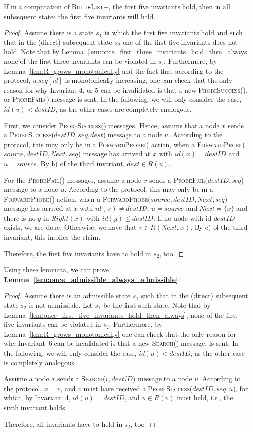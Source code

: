 \documentclass[a4paper,USenglish]{lipics}
\newcommand{\blp}{\textsc{Build-List+}\xspace}
\newcommand{\search}[1]{\textsc{Search(\ensuremath{#1})}\xspace}
\newcommand{\forwardprobe}[1]{\textsc{ForwardProbe(\ensuremath{#1})}\xspace}
\newcommand{\psuccess}[1]{\textsc{ProbeSuccess(\ensuremath{#1})}\xspace}
\newcommand{\pfail}[1]{\textsc{ProbeFail(\ensuremath{#1})}\xspace}
\begin{document}
\begin{lemma}\label{lem:once_first_five_invariants_hold_then_always}
 If in a computation of \blp, the first five invariants hold, then in all subsequent states the first five invariants will hold.
\end{lemma}
\begin{proof}
  Assume there is a state $s_1$ in which the first five invariants hold and such that in the (direct) subsequent state $s_2$ one of the first five invariants does not hold.
  Note that by Lemma~\ref{lem:once_first_three_invariants_hold_then_always} none of the first three invariants can be violated in $s_2$.
	Furthermore, by Lemma~\ref{lem:R_grows_monotonically} and the fact that according to the protocol, $u.seq[id]$ is monotonically increasing, one can check that the only reason for why Invariant 4, or 5 can be invalidated is that a new \psuccess{}, or \pfail{} message is sent.
	In the following, we will only consider the case, $id(u) < destID$, as the other cases are completely analogous.

	First, we consider \psuccess{} messages. Hence, assume that a node $x$ sends a \psuccess{destID,seq,dest} message to a node $u$.
	According to the protocol, this may only be in a \forwardprobe{} action, when a \forwardprobe{source,destID,Next,seq} message has arrived at $x$ with $id(x) = destID$ and $u = source$.
	By b) of the third invariant, $dest \in R(u)$.
	
	For the \pfail{} messages, assume a node $x$ sends a \pfail{destID, seq} message to a node $u$.
	According to the protocol, this may only be in a \forwardprobe{} action, when a \forwardprobe{source,destID,Next,seq} message has arrived at $x$ with $id(x) \neq destID$, $u = source$ and $Next = \{x\}$ and there is no $y$ in $Right(x)$ with $id(y) \leq destID$.
	If no node with id $destID$ exists, we are done.
	Otherwise, we have that $v \notin R(Next,w)$.
	By c) of the third invariant, this implies the claim.
  
	Therefore, the first five invariants have to hold in $s_2$, too.
\end{proof}
Using these lemmata, we can prove \textbf{Lemma~\ref{lem:once_admissible_always_admissible}}:
\begin{proof}
 Assume there is an admissible state $s_1$ such that in the (direct) subsequent state $s_2$ is not admissible.
 Let $s_1$ be the first such state.
	Note that by Lemma~\ref{lem:once_first_five_invariants_hold_then_always}, none of the first five invariants can be violated in $s_2$.
	Furthermore, by Lemma~\ref{lem:R_grows_monotonically} one can check that the only reason for why Invariant~6 can be invalidated is that a new \search{} message, is sent.
	In the following, we will only consider the case, $id(u) < destID$, as the other case is completely analogous.

	Assume a node $x$ sends a \search{v, destID} message to a node $u$.
	According to the protocol, $x = v$, and $v$ must have received a \psuccess{destID,seq,u}, for which, by Invariant~4, $id(u) = destID$, and $u \in R(v)$ must hold, i.e., the sixth invariant holds.
	
	Therefore, all invariants have to hold in $s_2$, too.
\end{proof}
\end{document}
